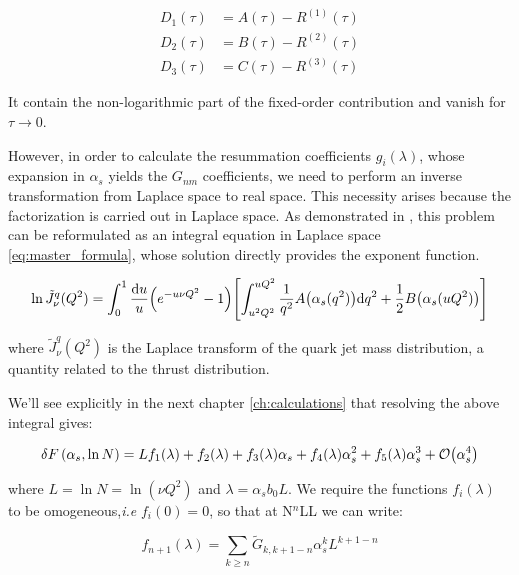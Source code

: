 \documentclass[../main.tex]{subfiles}
\begin{document}
\begin{equation}
    \begin{split}
        D_1(\tau) &=  A(\tau) - R^{(1)}(\tau)\\
        D_2(\tau) &=  B(\tau) - R^{(2)}(\tau)\\
        D_3(\tau) &=  C(\tau) - R^{(3)}(\tau)
    \end{split}
\end{equation}

It contain the non-logarithmic part of the fixed-order contribution and vanish for $\tau \to 0$.

However, in order to calculate the resummation coefficients $g_i(\lambda)$, whose expansion in $\alpha_s$ yields the $G_{nm}$ coefficients,  we need to perform an inverse transformation from Laplace space to real space.
This necessity arises because the factorization is carried out in Laplace space. As demonstrated in \cite{CATANI19933}, this problem can be reformulated as an integral equation in Laplace space \cref{eq:master_formula}, 
whose solution directly provides the exponent function.

\begin{equation}\label{eq:master formula}
    \ln \tilde{J}_\nu^q(Q^2) = \int_0^1 \frac{\dd u}{u} \qty(e^{-u \nu Q^2}-1)\qty[ \int_{u^2 Q^2}^{u Q^2} \frac{1}{q^2} A\qty(\alpha_s(q^2)) \dd q^2 + \frac{1}{2} B\qty(\alpha_s(u Q^2))]
\end{equation}

where $\tilde{J}_\nu^q(Q^2)$ is the Laplace transform of the quark jet mass distribution, a quantity related to the thrust distribution.

We'll see explicitly in the next chapter \cref{ch:calculations} that resolving the above integral gives:

\begin{equation}
    \var{F}(\alpha_s,\ln N) = L f_1(\lambda)  + f_2(\lambda) + f_3(\lambda) \alpha_s + f_4(\lambda) \alpha_s^2 + f_5(\lambda) \alpha_s^3 + \order{\alpha_s^4}
\end{equation}

where $L = \ln N = \ln(\nu Q^2)$ and $\lambda = \alpha_s b_0 L$.
We require the functions $f_i(\lambda)$ to be omogeneous,\emph{i.e} $f_i(0)=0$, so that at N$^n$LL we can write:

\begin{equation}
    f_{n+1}(\lambda) = \sum_{k \ge n} \tilde{G}_{k,k+1-n} \alpha_s^k L^{k+1-n}
\end{equation}
\end{document}
